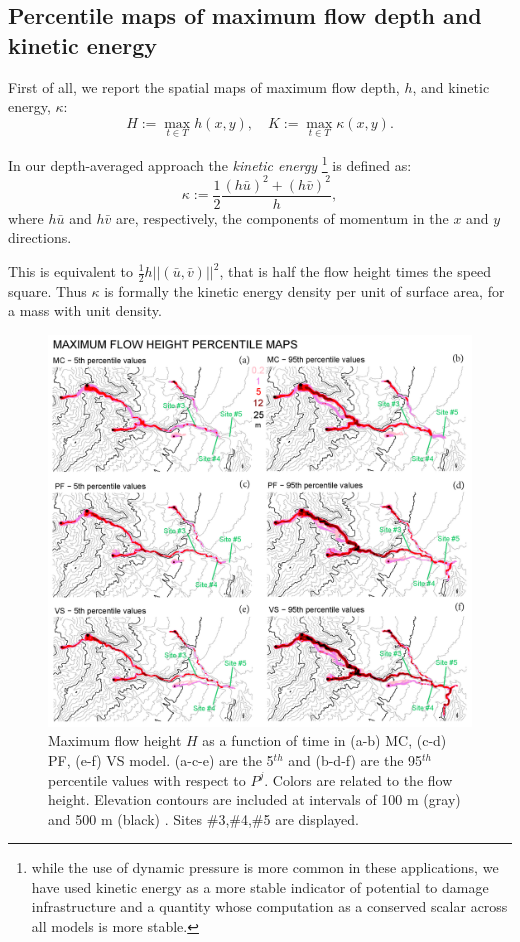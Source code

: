 \documentclass[nhess, manuscript]{copernicus}
\begin{document}
\subsection{Percentile maps of maximum flow depth and kinetic energy}
First of all, we report the spatial maps of maximum flow depth, $h$, and  kinetic energy, $\kappa$:
\begin{equation}
H:=\max_{t\in T} h(x,y), \quad K:=\max_{t\in T} \kappa(x,y).
\end{equation}

In our depth-averaged approach the \emph{kinetic energy} \footnote{while the use of dynamic pressure is more common in these applications, we have used kinetic energy as a more stable indicator of potential to damage infrastructure and a quantity whose computation as a conserved scalar across all models is more stable.} is defined as:
\begin{equation}
\kappa:=\frac{1}{2} \frac{(h\bar{u})^2+(h\bar{v})^2}{h},
\end{equation}
where $h\bar{u}$ and $h\bar{v}$ are, respectively, the components of momentum in the $x$ and $y$ directions.

This is equivalent to $\frac{1}{2} h ||(\bar{u},\bar{v})||^2$, that is half the flow height times the speed square. Thus $\kappa$ is formally the kinetic energy density per unit of surface area,  for a mass with unit density.
\begin{figure}[H]
\centering
\includegraphics[width=1\textwidth]{Fig3.png}
\caption{Maximum flow height $H$ as a function of time in (a-b) MC, (c-d) PF, (e-f) VS model. (a-c-e) are the 5$^{th}$ and (b-d-f) are the 95$^{th}$ percentile values with respect to $P^j$. Colors are related to the flow height. Elevation contours are included at intervals of 100 m (gray) and 500 m (black) \citep{NASA2014}. Sites \#3,\#4,\#5 are displayed.}
\label{Fig3}
\end{figure}
\end{document}
